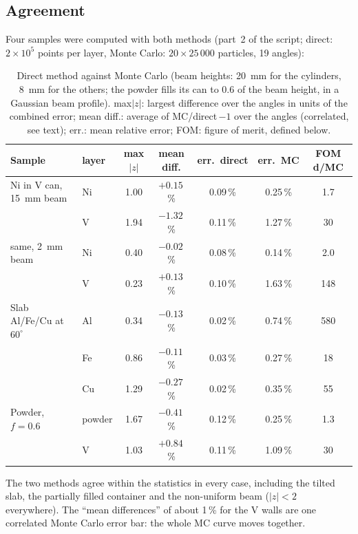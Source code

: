\subsection{Agreement}

Four samples were computed with both methods (part~2 of the script; direct: $2\times10^5$ points per layer, Monte Carlo: $20\times25\,000$
particles, 19 angles):

\begin{table}[H]
  \centering\small
  \begin{tabular}{@{}>{\raggedright\arraybackslash}p{4.4cm}lccccc@{}}
    \toprule \textbf{Sample} & \textbf{layer} & max$|z|$ & \textbf{mean diff.} & \textbf{err.\ direct} & \textbf{err.\ MC} & \textbf{FOM d/MC} \\ \midrule
    Ni in V can, 15~mm beam & Ni & 1.00 & $+0.15$\,\% & 0.09\,\% & 0.25\,\% & 1.7 \\
                                      & V  & 1.94 & $-1.32$\,\% & 0.11\,\% & 1.27\,\% & 30 \\
    same, 2~mm beam                   & Ni & 0.40 & $-0.02$\,\% & 0.08\,\% & 0.14\,\% & 2.0 \\
                                      & V  & 0.23 & $+0.13$\,\% & 0.10\,\% & 1.63\,\% & 148 \\
    Slab Al/Fe/Cu at $60^\circ$ & Al & 0.34 & $-0.13$\,\% & 0.02\,\% & 0.74\,\% & 580 \\
                                      & Fe & 0.86 & $-0.11$\,\% & 0.03\,\% & 0.27\,\% & 18 \\
                                      & Cu & 1.29 & $-0.27$\,\% & 0.02\,\% & 0.35\,\% & 55 \\
    Powder, $f=0.6$ & powder & 1.67 & $-0.41$\,\% & 0.12\,\% & 0.25\,\% & 1.3 \\
                                      & V  & 1.03 & $+0.84$\,\% & 0.11\,\% & 1.09\,\% & 30 \\ \bottomrule
  \end{tabular}
  \caption{Direct method against Monte Carlo (beam heights: 20~mm for the cylinders, 8~mm for the others; the powder fills its can to 0.6 of the beam height, in a Gaussian beam profile). max$|z|$: largest difference over the angles in units of the combined error; mean diff.: average
  of MC/direct\,$-1$ over the angles (correlated, see text); err.: mean relative error; FOM: figure of merit, defined below.}
  \label{tab:direct-mc}
\end{table}

The two methods agree within the statistics in every case, including the tilted slab, the partially filled container and the non-uniform beam
($|z|<2$ everywhere). The ``mean differences'' of about 1\,\% for the V walls are one correlated Monte Carlo error bar: the whole MC curve moves
together.

